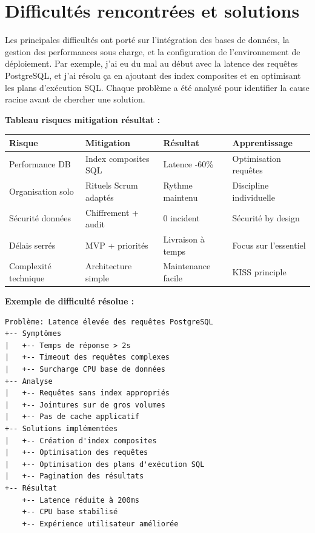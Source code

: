 \section{Difficultés rencontrées et solutions}

Les principales difficultés ont porté sur l'intégration des bases de données, la gestion des performances sous charge, et la configuration de l'environnement de déploiement. Par exemple, j'ai eu du mal au début avec la latence des requêtes PostgreSQL, et j'ai résolu ça en ajoutant des index composites et en optimisant les plans d'exécution SQL. Chaque problème a été analysé pour identifier la cause racine avant de chercher une solution.

\begin{exemple}
\textbf{Tableau risques \myarrow mitigation \myarrow résultat :}
\begin{center}
\begin{tabular}{|l|l|l|l|}
\hline
\textbf{Risque} & \textbf{Mitigation} & \textbf{Résultat} & \textbf{Apprentissage} \\
\hline
Performance DB & Index composites SQL & Latence -60\% & Optimisation requêtes \\
Organisation solo & Rituels Scrum adaptés & Rythme maintenu & Discipline individuelle \\
Sécurité données & Chiffrement + audit & 0 incident & Sécurité by design \\
Délais serrés & MVP + priorités & Livraison à temps & Focus sur l'essentiel \\
Complexité technique & Architecture simple & Maintenance facile & KISS principle \\
\hline
\end{tabular}
\end{center}

\textbf{Exemple de difficulté résolue :}
\begin{verbatim}
Problème: Latence élevée des requêtes PostgreSQL
+-- Symptômes
|   +-- Temps de réponse > 2s
|   +-- Timeout des requêtes complexes
|   +-- Surcharge CPU base de données
+-- Analyse
|   +-- Requêtes sans index appropriés
|   +-- Jointures sur de gros volumes
|   +-- Pas de cache applicatif
+-- Solutions implémentées
|   +-- Création d'index composites
|   +-- Optimisation des requêtes
|   +-- Optimisation des plans d'exécution SQL
|   +-- Pagination des résultats
+-- Résultat
    +-- Latence réduite à 200ms
    +-- CPU base stabilisé
    +-- Expérience utilisateur améliorée
\end{verbatim}
\end{exemple}




